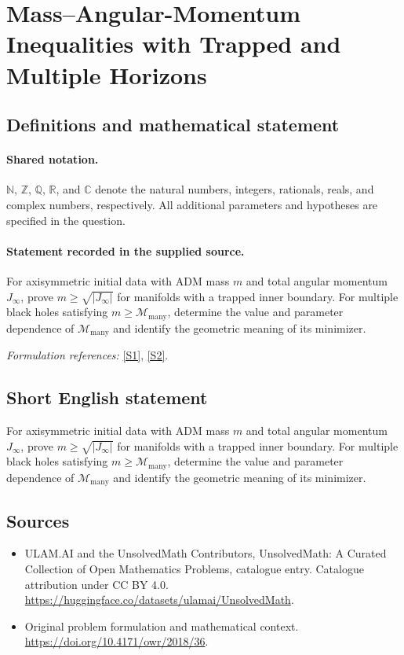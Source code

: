 \documentclass[11pt]{article}
\newcommand{\sref}[2]{\hyperlink{source:#1:#2}{[S#2]}}
\begin{document}
\section{Mass–Angular-Momentum Inequalities with Trapped and Multiple Horizons}\label{statement}

\subsection{Definitions and mathematical statement}

\paragraph{Shared notation.}$\mathbb N$, $\mathbb Z$, $\mathbb Q$, $\mathbb R$, and $\mathbb C$ denote the natural numbers, integers, rationals, reals, and complex numbers, respectively. All additional parameters and hypotheses are specified in the question.


\paragraph{Statement recorded in the supplied source.}
For axisymmetric initial data with ADM mass $m$ and total angular momentum $J_\infty$, prove $m\geq\sqrt{|J_\infty|}$ for manifolds with a trapped inner boundary. For multiple black holes satisfying $m\geq\mathcal M_{\mathrm{many}}$, determine the value and parameter dependence of $\mathcal M_{\mathrm{many}}$ and identify the geometric meaning of its minimizer.
\par\smallskip\textit{Formulation references:} \sref{statement}{1}, \sref{statement}{2}.
\subsection{Short English statement}
For axisymmetric initial data with ADM mass $m$ and total angular momentum $J_\infty$, prove $m\geq\sqrt{|J_\infty|}$ for manifolds with a trapped inner boundary. For multiple black holes satisfying $m\geq\mathcal M_{\mathrm{many}}$, determine the value and parameter dependence of $\mathcal M_{\mathrm{many}}$ and identify the geometric meaning of its minimizer.
\subsection{Sources}
\begin{itemize}
\item[\hypertarget{source:statement:1}{S1}] ULAM.AI and the UnsolvedMath Contributors, UnsolvedMath: A Curated Collection of Open Mathematics Problems, catalogue entry. Catalogue attribution under CC BY 4.0.
\url{https://huggingface.co/datasets/ulamai/UnsolvedMath}.
\item[\hypertarget{source:statement:2}{S2}] Original problem formulation and mathematical context.
\url{https://doi.org/10.4171/owr/2018/36}.
\end{itemize}
\label{end:statement}
\end{document}
